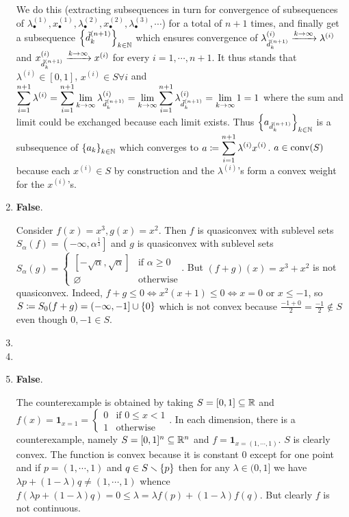 \begin{enumerate}[leftmargin=*]
We do this (extracting subsequences in turn for convergence of subsequences of $\lambda^{(1)}_{\bullet},x^{(1)}_{\bullet},\lambda^{(2)}_{\bullet}, x^{(2)}_{\bullet}, \lambda^{(3)}_{\bullet},\cdots$) for a total of $n+1$ times, and finally get a subsequence $\left\{{\tilde{d}}^{(n+1)}_{k}\right\}_{{k\in\mathbb{N}}}$ which ensures convergence of $\lambda^{(i)}_{{\tilde{d}}^{(n+1)}_{k}}\xrightarrow{k\to\infty} \lambda^{(i)}$ and $x^{(i)}_{{\tilde{d}}^{(n+1)}_{k}}\xrightarrow{k\to\infty} x^{(i)}$ for every $i=1,\cdots,n+1$. It thus stands that $\lambda^{(i)}\in[0,1]$, $ x^{(i)}\in S\forall i$ and $\displaystyle\sum_{i=1}^{n+1}\lambda^{(i)} = \sum_{i=1}^{n+1}\lim_{{k\to\infty}}\lambda^{(i)}_{{\tilde{d}}^{(n+1)}_{k}} = \lim_{{k\to\infty}}\sum_{i=1}^{n+1}\lambda^{(i)}_{{\tilde{d}}^{(n+1)}_{k}} = \lim_{{k\to\infty}} 1 = 1$ where the sum and limit could be exchanged because each limit exists. Thus $\left\{a_{{\tilde{d}}^{(n+1)}_{k}}\right\}_{k\in\mathbb{N}}$ is a subsequence of $\left\{a_{k}\right\}_{k\in\mathbb{N}}$ which converges to $\displaystyle a\coloneqq \sum_{i=1}^{n+1}\lambda^{(i)}x^{(i)}$. $a\in \text{conv}(S)$ because each $x^{(i)}\in S$ by construction and the $\lambda^{(i)}$'s form a convex weight for the $x^{(i)}$'s.

\item \textbf{False}.

Consider $f(x) = x^{3}, g(x) = x^{2}$. Then $f$ is quasiconvex with sublevel sets $S_{\alpha}(f) = \left(-\infty,\alpha^{\frac13}\right]$ and $g$ is quasiconvex with sublevel sets $S_{\alpha}(g) = \begin{cases}\left[-\sqrt\alpha,\sqrt\alpha\right] &\text{if }\alpha \geq 0\\\varnothing&\text{otherwise}
\end{cases}$. But $(f+g)(x) = x^{3}+x^{2}$ is not quasiconvex. Indeed, $f+g\leq 0\iff x^{2}(x+1)\leq 0\iff x=0\text{ or } x \leq -1$, so $S\coloneqq S_{0}(f+g) = (-\infty,-1]\cup \left\{0\right\}$ which is not convex because $\frac{-1+0}{2} = \frac{-1}{2}\notin S$ even though $0,-1\in S$.

\item

\item

\item \textbf{False}.

The counterexample is obtained by taking $S=[0,1]\subseteq \mathbb{R}$ and $f(x) = \pmb 1_{x=1} = \begin{cases}
0 & \text{if } 0\leq x < 1\\
1 & \text{otherwise}
\end{cases}$. In each dimension, there is a counterexample, namely $S=[0,1]^{n}\subseteq\mathbb{R}^{n}$ and $f=\pmb 1_{x=(1,\cdots,1)}$. $S$ is clearly convex. The function is convex because it is constant $0$ except for one point and if $p=(1,\cdots,1)$ and $q\in S\smallsetminus \left\{p\right\}$ then for any $\lambda\in(0,1]$ we have $\lambda p + (1-\lambda)q\neq (1,\cdots,1)$ whence $f(\lambda p + (1-\lambda)q) = 0 \leq \lambda = \lambda f(p) + (1-\lambda)f(q)$. But clearly $f$ is not continuous.


\end{enumerate}
